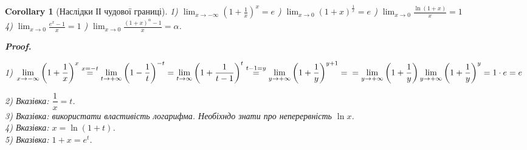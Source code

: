 \documentclass[a4paper, 14pt]{article}
\makeatletter
\def\qed{$\blacksquare$}
\theoremstyle{theoremdd}
\theoremstyle{theoremdd}
\theoremstyle{theoremdd}
\theoremstyle{theoremdd}
\theoremstyle{theoremdd}
\theoremstyle{theoremdd}
\theoremstyle{theoremdd}
\theoremstyle{theoremdd}
\newtheorem{corollary}[theorem]{Corollary}
\renewenvironment{proof}[1][Proof.\\]{\par
\pushQED{\hfill \qed}%
\normalfont \topsep6\p@\@plus6\p@\relax
\trivlist
\item\relax
{\bfseries
#1\@addpunct{.}}\hspace\labelsep\ignorespaces
}{%
\popQED\endtrivlist\@endpefalse
}
\makeatother
\begin{document}
\begin{corollary}[Наслідки ІІ чудової границі]
1) $\displaystyle \lim_{x \to -\infty} \left(1 +\frac{1}{x} \right)^x = e$ ) $\displaystyle \lim_{x \to 0} \left(1 +x \right)^{\textstyle \frac{1}{x}} = e$ ) $\displaystyle \lim_{x \to 0} \frac{\ln(1+x)}{x} = 1$ \\ 4) $\displaystyle \lim_{x \to 0} \frac{e^x - 1}{x} = 1$ ) $\displaystyle \lim_{x \to 0} \frac{(1+x)^\alpha - 1}{x} = \alpha$.

\begin{proof}
1) $\displaystyle\lim_{x \to -\infty} \left(1 + \dfrac{1}{x} \right)^x \overset{x =-t}{=} \lim_{t \to +\infty} \left(1 - \dfrac{1}{t} \right)^{-t} = \lim_{t \to \infty} \left(1 + \dfrac{1}{t-1} \right)^t \overset{t-1 = y}{=} \lim_{y \to +\infty} \left(1 + \dfrac{1}{y} \right)^{y+1} = \\ = \lim_{y \to +\infty} \left( 1 + \dfrac{1}{y} \right) \lim_{y \to +\infty} \left( 1 + \dfrac{1}{y} \right)^y = 1 \cdot e = e$
\end{proof}

2) \textit{Вказівка: $\dfrac{1}{x} = t$.}\\
3) \textit{Вказівка: використати властивість логарифма. Необіхндо знати про неперервність $\ln x$.}\\
4) \textit{Вказівка: $x = \ln(1+t)$.}\\
5) \textit{Вказівка: $1 + x = e^t$.}
\end{corollary}
\end{document}
